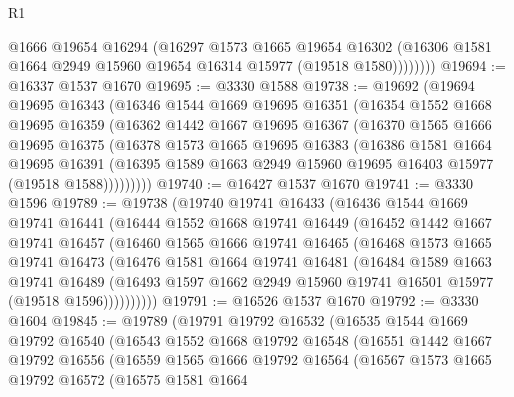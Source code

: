 \begin{lexlean}{R1}
\begin{coremodule}
              @1666
              @19654
              @16294
              (@16297
                @1573
                @1665
                @19654
                @16302
                (@16306 @1581 @1664 @2949 @15960 @19654 @16314 @15977 (@19518 @1580))))))))
@19694 := @16337 @1537 @1670
@19695 := @3330 @1588
@19738 := @19692
    (@19694
      @19695
      @16343
      (@16346
        @1544
        @1669
        @19695
        @16351
        (@16354
          @1552
          @1668
          @19695
          @16359
          (@16362
            @1442
            @1667
            @19695
            @16367
            (@16370
              @1565
              @1666
              @19695
              @16375
              (@16378
                @1573
                @1665
                @19695
                @16383
                (@16386
                  @1581
                  @1664
                  @19695
                  @16391
                  (@16395 @1589 @1663 @2949 @15960 @19695 @16403 @15977 (@19518 @1588)))))))))
@19740 := @16427 @1537 @1670
@19741 := @3330 @1596
@19789 := @19738
    (@19740
      @19741
      @16433
      (@16436
        @1544
        @1669
        @19741
        @16441
        (@16444
          @1552
          @1668
          @19741
          @16449
          (@16452
            @1442
            @1667
            @19741
            @16457
            (@16460
              @1565
              @1666
              @19741
              @16465
              (@16468
                @1573
                @1665
                @19741
                @16473
                (@16476
                  @1581
                  @1664
                  @19741
                  @16481
                  (@16484
                    @1589
                    @1663
                    @19741
                    @16489
                    (@16493 @1597 @1662 @2949 @15960 @19741 @16501 @15977 (@19518 @1596))))))))))
@19791 := @16526 @1537 @1670
@19792 := @3330 @1604
@19845 := @19789
    (@19791
      @19792
      @16532
      (@16535
        @1544
        @1669
        @19792
        @16540
        (@16543
          @1552
          @1668
          @19792
          @16548
          (@16551
            @1442
            @1667
            @19792
            @16556
            (@16559
              @1565
              @1666
              @19792
              @16564
              (@16567
                @1573
                @1665
                @19792
                @16572
                (@16575
                  @1581
                  @1664

\end{coremodule}
\end{lexlean}
